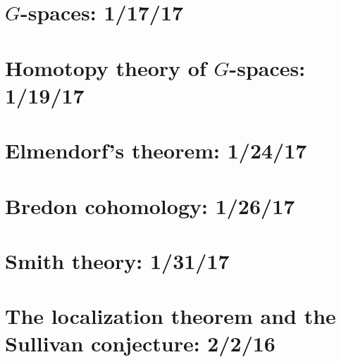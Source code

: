 \documentclass{style_EHT}
\begin{document}
\frontstuff

\section{$G$-spaces: 1/17/17}
	
\section{Homotopy theory of $G$-spaces: 1/19/17}
	
\section{Elmendorf's theorem: 1/24/17}
	
\section{Bredon cohomology: 1/26/17}
	
\section{Smith theory: 1/31/17}
	
\section{The localization theorem and the Sullivan conjecture: 2/2/16}
	


{}

\end{document}
